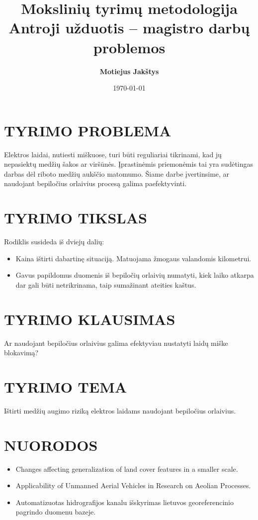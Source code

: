 \documentclass{article}
\title{Mokslinių tyrimų metodologija\\ \vspace{4mm} 
Antroji užduotis -- magistro darbų problemos}
\author{\bf Motiejus Jak\v{s}tys\\ \bf}
\date{\today}
\begin{document}
\maketitle

\section{TYRIMO PROBLEMA}

Elektros laidai, nutiesti miškuose, turi būti reguliariai tikrinami, kad jų
nepasiektų medžių šakos ar viršūnės. Įprastinėmis priemonėmis tai yra
sudėtingas darbas dėl riboto medžių aukščio matomumo. Šiame darbe įvertinsime,
ar naudojant bepiločius orlaivius procesą galima paefektyvinti.


\section{TYRIMO TIKSLAS}

Rodiklis susideda iš dviejų dalių:
\begin{itemize}

    \item Kaina ištirti dabartinę situaciją. Matuojama žmogaus valandomis
        kilometrui.

    \item Gavus papildomus duomenis iš bepiločių orlaivių numatyti, kiek laiko
        atkarpa dar gali būti netrikrinama, taip sumažinant ateities kaštus.

\end{itemize}


\section{TYRIMO KLAUSIMAS}

Ar naudojant bepiločius orlaivius galima efektyviau nustatyti laidų miške
blokavimą?

\section{TYRIMO TEMA}


Ištirti medžių augimo riziką elektros laidams naudojant bepiločius orlaivius.

\section{NUORODOS}

\begin{itemize}
    \item Changes affecting generalization of land cover features in a smaller scale.
    \item Applicability of Unmanned Aerial Vehicles in Research on Aeolian Processes.
    \item Automatizuotas hidrografijos kanalu išskyrimas lietuvos georeferencinio pagrindo duomenu bazeje.
\end{itemize}
\end{document}
